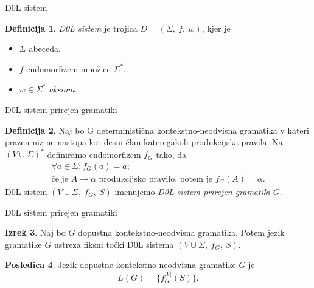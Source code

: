 \documentclass{beamer}
\theoremstyle{definition}
\newtheorem{definicija}{Definicija}[section]
\newtheorem{izrek}[definicija]{Izrek}
\newtheorem{posledica}[definicija]{Posledica}
\begin{document}
\begin{frame}{D0L sistem}
    \begin{definicija}
        \textit{D0L sistem} je trojica $ D = (\Sigma, \ f, \ w) $, kjer je
        \begin{itemize}
            \item<2-> $ \Sigma $ abeceda,
            \item<3-> $ f $ endomorfizem množice $ \Sigma^* $,
            \item<4-> $ w \in \Sigma^* $ \textit{aksiom}.
        \end{itemize}
        \pause

    \end{definicija}
\end{frame}

\begin{frame}{D0L sistem prirejen gramatiki}
    \begin{definicija}
        Naj bo G deterministična kontekstno-neodvisna gramatika v kateri prazen niz ne nastopa kot desni član kateregakoli
        produkcijska pravila. Na $ (V \cup \Sigma)^* $ definiramo endomorfizem $ f_G $ tako, da 
        \begin{gather*}
            \forall a \in \Sigma \colon f_G(a) = a; \\
            \text{če je } A \rightarrow \alpha \text{ produkcijsko pravilo, potem je } f_G(A) = \alpha.
        \end{gather*}
        \pause
        D0L sistem $ (V \cup \Sigma, \ f_G, \ S) $ imenujemo \textit{D0L sistem prirejen gramatiki $G$}.
    \end{definicija}
\end{frame}

\begin{frame}{D0L sistem prirejen gramatiki}
    \begin{izrek}
        Naj bo $G$ dopustna kontekstno-neodvisna gramatika.
        Potem jezik gramatike $G$ ustreza fiksni točki D0L sistema $ (V \cup \Sigma, \ f_G, \ S) $.
    \end{izrek}
    \pause
    \begin{posledica}
        Jezik dopustne kontekstno-neodvisna gramatike $G$ je
        \[
            L(G) = \{f_G^{|V|}(S) \}.
        \]
    \end{posledica}
\end{frame}
\end{document}
